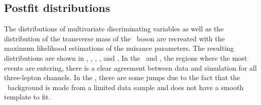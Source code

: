 \subsection{Postfit distributions}
 The distributions of multivariate discriminating  variables as well as the distribution of the transverse mass of the \PW\ boson are recreated with the maximum likelihood estimations of the nuisance parameters. The resulting distributions are shown in , , , , and . 
 In the \WZCR\ and \TTSR, the regions where the most events  are entering, there is a clear agreement between data and simulation for all three-lepton channels. In the \STSR, there are some jumps due to the fact that the \NPL\ background is made from a limited data sample and does not have a smooth template to fit. 
